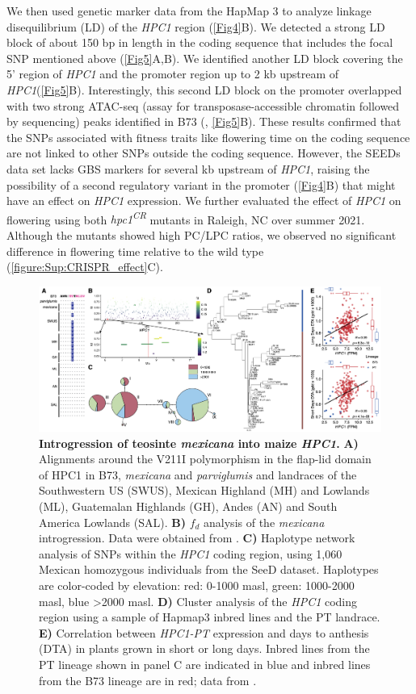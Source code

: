 \documentclass[9pt,twocolumn,twoside,lineno]{biorxiv}
\newcommand{\mex}{\textit{mexicana}\xspace}
\newcommand{\hpc}{\textit{HPC1}\xspace}
\newcommand{\parv}{\textit{parviglumis}\xspace}
\begin{document}
We then used genetic marker data from the HapMap 3 \cite{Bukowski2017-ng} to analyze linkage disequilibrium (LD) of the \hpc region (\cref{Fig4}B).
We detected a strong LD block of about 150 bp in length in the coding sequence that includes the focal SNP mentioned above (\cref{Fig5}A,B). 
We identified another LD block covering the 5' region of \hpc and the promoter region up to 2 kb upstream of \hpc (\cref{Fig5}B). 
Interestingly, this second LD block on the promoter overlapped with two strong ATAC-seq (assay for transposase-accessible chromatin followed by sequencing) peaks identified in B73 (\cite{Ricci2019-zj}, \cref{Fig5}B).
These results confirmed that the SNPs associated with fitness traits like flowering time on the  coding sequence are not linked to other SNPs outside the  coding sequence.
However, the SEEDs data set lacks GBS markers for several kb upstream of \hpc, raising the possibility of a second regulatory variant in the promoter (\cref{Fig4}B) that might have an effect on \hpc expression. 
We further evaluated the effect of \hpc on flowering using both \textit{hpc1\textsuperscript{CR}} mutants in Raleigh, NC over summer 2021. 
Although the mutants showed high PC/LPC ratios, we observed no significant difference in flowering time relative to the wild type (\cref{figure:Sup:CRISPR_effect}C). 
\begin{figure}[!ht]
\includegraphics[width=0.8\paperwidth]{Figures/Fig_6.png}
\caption{\textbf{Introgression of teosinte \mex into maize \hpc.}  
\textbf{A)} Alignments around the V211I polymorphism in the flap-lid domain of HPC1 in B73, \mex and \parv and landraces of the Southwestern US (SWUS), Mexican Highland (MH) and Lowlands (ML), Guatemalan Highlands (GH), Andes (AN) and South America Lowlands (SAL).
\textbf{B)} \(f_d\) analysis of the \mex introgression. Data were obtained from \cite{Gonzalez-Segovia2019-jy}. 
\textbf{C)} Haplotype network analysis of SNPs within the \hpc coding region, using 1,060 Mexican homozygous individuals from the SeeD dataset. Haplotypes are color-coded by elevation: red: 0-1000 masl, green: 1000-2000 masl, blue >2000 masl.
\textbf{D)} Cluster analysis of the \hpc coding region using a sample of Hapmap3 inbred lines and the PT landrace.
\textbf{E)} Correlation between \textit{HPC1-PT} expression and days to anthesis (DTA) in plants grown in short or long days. 
Inbred lines from the PT lineage shown in panel C are indicated in blue and inbred lines from the B73 lineage are in red;
data from \cite{Kremling2018-gn}.}
\label{Fig6}
\end{figure}
\end{document}
